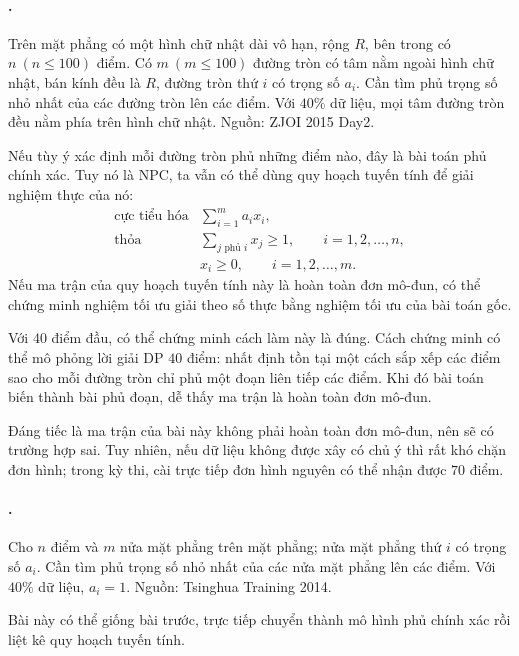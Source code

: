\documentclass[11pt]{article}
\begin{document}
\paragraph{.}
Trên mặt phẳng có một hình chữ nhật dài vô hạn, rộng \(R\), bên trong có
\(n\ (n\le 100)\) điểm. Có \(m\ (m\le 100)\) đường tròn có tâm nằm ngoài hình
chữ nhật, bán kính đều là \(R\), đường tròn thứ \(i\) có trọng số \(a_i\).
Cần tìm phủ trọng số nhỏ nhất của các đường tròn lên các điểm. Với \(40\%\)
dữ liệu, mọi tâm đường tròn đều nằm phía trên hình chữ nhật. Nguồn: ZJOI 2015
Day2.

Nếu tùy ý xác định mỗi đường tròn phủ những điểm nào, đây là bài toán phủ
chính xác. Tuy nó là NPC, ta vẫn có thể dùng quy hoạch tuyến tính để giải
nghiệm thực của nó:
\[
\begin{array}{ll}
\text{cực tiểu hóa} & \displaystyle \sum_{i=1}^{m}a_ix_i,\\[0.4em]
\text{thỏa} & \displaystyle \sum_{j\text{ phủ }i}x_j\ge 1,
  \qquad i=1,2,\ldots,n,\\[0.4em]
& x_i\ge 0,\qquad i=1,2,\ldots,m.
\end{array}
\]
Nếu ma trận của quy hoạch tuyến tính này là hoàn toàn đơn mô-đun, có thể
chứng minh nghiệm tối ưu giải theo số thực bằng nghiệm tối ưu của bài toán
gốc.

Với \(40\) điểm đầu, có thể chứng minh cách làm này là đúng. Cách chứng minh
có thể mô phỏng lời giải DP \(40\) điểm: nhất định tồn tại một cách sắp xếp
các điểm sao cho mỗi đường tròn chỉ phủ một đoạn liên tiếp các điểm. Khi đó
bài toán biến thành bài phủ đoạn, dễ thấy ma trận là hoàn toàn đơn mô-đun.

Đáng tiếc là ma trận của bài này không phải hoàn toàn đơn mô-đun, nên sẽ có
trường hợp sai. Tuy nhiên, nếu dữ liệu không được xây có chủ ý thì rất khó
chặn đơn hình; trong kỳ thi, cài trực tiếp đơn hình nguyên có thể nhận được
\(70\) điểm.

\paragraph{.}
Cho \(n\) điểm và \(m\) nửa mặt phẳng trên mặt phẳng; nửa mặt phẳng thứ \(i\)
có trọng số \(a_i\). Cần tìm phủ trọng số nhỏ nhất của các nửa mặt phẳng lên
các điểm. Với \(40\%\) dữ liệu, \(a_i=1\). Nguồn: Tsinghua Training 2014.

Bài này có thể giống bài trước, trực tiếp chuyển thành mô hình phủ chính xác
rồi liệt kê quy hoạch tuyến tính.
\end{document}
